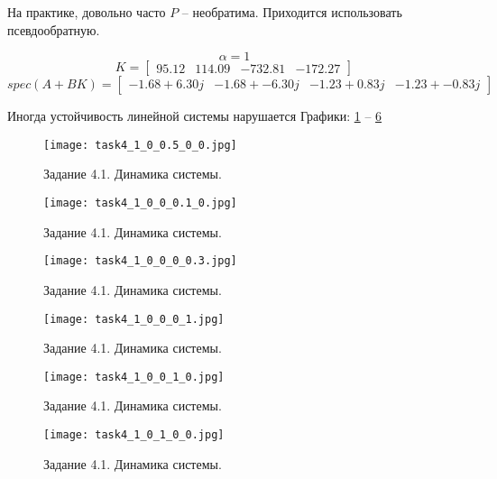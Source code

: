 На практике, довольно часто \(P\) -- необратима. Приходится использовать псевдообратную.

\[\alpha = 1\]
\[K = \begin{bmatrix}
    95.12 &  114.09 & -732.81 & -172.27
  \end{bmatrix}\]
  \[spec(A + B K) = \begin{bmatrix}
   -1.68 + 6.30j & -1.68 + -6.30j & -1.23 + 0.83j & -1.23 + -0.83j
  \end{bmatrix}\]

  Иногда устойчивость линейной системы нарушается
  Графики: \ref{fig:task4_1_1} -- \ref{fig:task4_1_6}
  \begin{figure}[]
    \centering
    \texttt{[image: task4\_1\_0\_0.5\_0\_0.jpg]}
    \caption{Задание 4.1. Динамика системы.}
    \label{fig:task4_1_1}
\end{figure}

\begin{figure}[]
    \centering
    \texttt{[image: task4\_1\_0\_0\_0.1\_0.jpg]}
    \caption{Задание 4.1. Динамика системы.}
    \label{fig:task4_1_2}
\end{figure}

\begin{figure}[]
    \centering
    \texttt{[image: task4\_1\_0\_0\_0\_0.3.jpg]}
    \caption{Задание 4.1. Динамика системы.}
    \label{fig:task4_1_3}
\end{figure}

\begin{figure}[]
    \centering
    \texttt{[image: task4\_1\_0\_0\_0\_1.jpg]}
    \caption{Задание 4.1. Динамика системы.}
    \label{fig:task4_1_4}
\end{figure}

\begin{figure}[]
    \centering
    \texttt{[image: task4\_1\_0\_0\_1\_0.jpg]}
    \caption{Задание 4.1. Динамика системы.}
    \label{fig:task4_1_5}
\end{figure}

\begin{figure}[]
    \centering
    \texttt{[image: task4\_1\_0\_1\_0\_0.jpg]}
    \caption{Задание 4.1. Динамика системы.}
    \label{fig:task4_1_6}
\end{figure}



